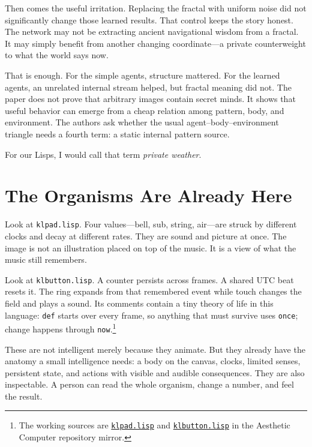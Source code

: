 \documentclass[10pt,letterpaper]{article}
\newcommand{\mono}[1]{\texttt{#1}}
\begin{document}
Then comes the useful irritation. Replacing the fractal with uniform noise did not significantly change those learned results. That control keeps the story honest. The network may not be extracting ancient navigational wisdom from a fractal. It may simply benefit from another changing coordinate---a private counterweight to what the world says now.

That is enough. For the simple agents, structure mattered. For the learned agents, an unrelated internal stream helped, but fractal meaning did not. The paper does not prove that arbitrary images contain secret minds. It shows that useful behavior can emerge from a cheap relation among pattern, body, and environment. The authors ask whether the usual agent--body--environment triangle needs a fourth term: a static internal pattern source.

For our Lisps, I would call that term \textit{private weather}.

\section{The Organisms Are Already Here}

Look at \mono{klpad.lisp}. Four values---bell, sub, string, air---are struck by different clocks and decay at different rates. They are sound and picture at once. The image is not an illustration placed on top of the music. It is a view of what the music still remembers.

Look at \mono{klbutton.lisp}. A counter persists across frames. A shared UTC beat resets it. The ring expands from that remembered event while touch changes the field and plays a sound. Its comments contain a tiny theory of life in this language: \mono{def} starts over every frame, so anything that must survive uses \mono{once}; change happens through \mono{now}.\footnote{The working sources are \href{https://github.com/whistlegraph/aesthetic-computer/blob/main/system/public/aesthetic.computer/disks/klpad.lisp}{\mono{klpad.lisp}} and \href{https://github.com/whistlegraph/aesthetic-computer/blob/main/system/public/aesthetic.computer/disks/klbutton.lisp}{\mono{klbutton.lisp}} in the Aesthetic Computer repository mirror.}

These are not intelligent merely because they animate. But they already have the anatomy a small intelligence needs: a body on the canvas, clocks, limited senses, persistent state, and actions with visible and audible consequences. They are also inspectable. A person can read the whole organism, change a number, and feel the result.
\end{document}
